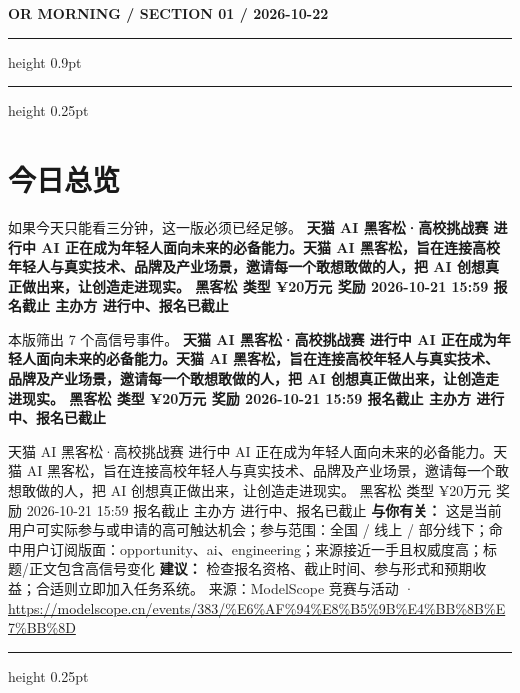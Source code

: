 \documentclass[10.5pt]{ctexart}
\begin{document}
{\small\bfseries OR MORNING / SECTION 01 / 2026-10-22}
\vspace{2mm}
\hrule height 0.9pt
\vspace{1.5mm}
\hrule height 0.25pt
\vspace{4mm}
\section*{今日总览}
{\color{ormuted} 如果今天只能看三分钟，这一版必须已经足够。}
\vspace{2mm}
{\fontsize{25}{29}\selectfont\bfseries 天猫 AI 黑客松·高校挑战赛 进行中 AI 正在成为年轻人面向未来的必备能力。天猫 AI 黑客松，旨在连接高校年轻人与真实技术、品牌及产业场景，邀请每一个敢想敢做的人，把 AI 创想真正做出来，让创造走进现实。 黑客松 类型 ¥20万元 奖励 2026-10-21 15:59 报名截止 主办方 进行中、报名已截止}\par
\vspace{2mm}
{\large 本版筛出 7 个高信号事件。}
\vspace{3mm}
{\Large\bfseries 天猫 AI 黑客松·高校挑战赛 进行中 AI 正在成为年轻人面向未来的必备能力。天猫 AI 黑客松，旨在连接高校年轻人与真实技术、品牌及产业场景，邀请每一个敢想敢做的人，把 AI 创想真正做出来，让创造走进现实。 黑客松 类型 ¥20万元 奖励 2026-10-21 15:59 报名截止 主办方 进行中、报名已截止}\par
天猫 AI 黑客松·高校挑战赛 进行中 AI 正在成为年轻人面向未来的必备能力。天猫 AI 黑客松，旨在连接高校年轻人与真实技术、品牌及产业场景，邀请每一个敢想敢做的人，把 AI 创想真正做出来，让创造走进现实。 黑客松 类型 ¥20万元 奖励 2026-10-21 15:59 报名截止 主办方 进行中、报名已截止
\textbf{与你有关：} 这是当前用户可实际参与或申请的高可触达机会；参与范围：全国 / 线上 / 部分线下；命中用户订阅版面：opportunity、ai、engineering；来源接近一手且权威度高；标题/正文包含高信号变化
\textbf{建议：} 检查报名资格、截止时间、参与形式和预期收益；合适则立即加入任务系统。
{\footnotesize\color{ormuted} 来源：ModelScope 竞赛与活动 · \url{https://modelscope.cn/events/383/%E6%AF%94%E8%B5%9B%E4%BB%8B%E7%BB%8D}}
\vspace{3mm}
\hrule height 0.25pt
\vspace{3mm}
\end{document}
